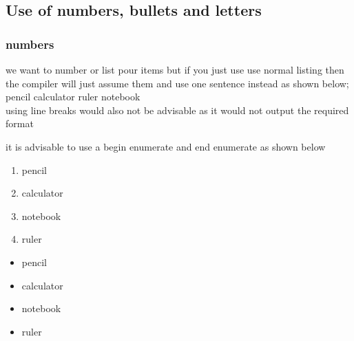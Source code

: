 \documentclass[a4paper,12pt]{article}
\begin{document}
  	 \subsection{Use of numbers, bullets and letters}
  	 \subsubsection{numbers}
  	 we want to number or list pour items but if you just use use normal listing then the compiler will just assume them and use one sentence instead as shown below;
  	 pencil
  	 calculator
  	 ruler
  	 notebook\\
  	 using line breaks would also not be advisable as it would  not output the required format
  	 
  	 it is advisable to use a begin enumerate and end enumerate as shown below
  	 
  	 \begin{enumerate}
  	 	\item pencil
  	 	\item calculator
  	 	\item notebook
  	 	\item ruler
  	 	\end{enumerate}
  	 \begin{itemize}
  	 	\item pencil
  	 	\item calculator 
  	 	\item notebook
  	 	\item ruler
  	 \end{itemize}
  	 
  	 
\end{document}

